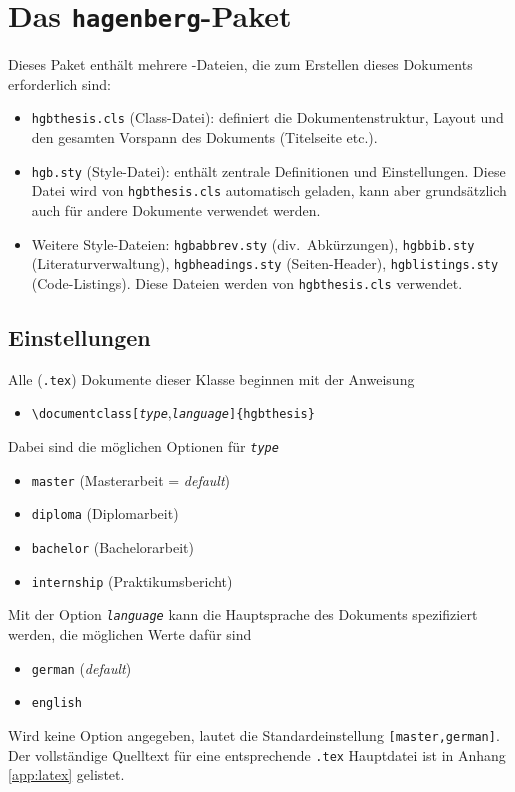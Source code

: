 \section{Das \texttt{hagenberg}-Paket}

Dieses Paket enthält mehrere \latex-Dateien, die 
zum Erstellen dieses Dokuments erforderlich sind:
%
\begin{itemize}
\item \nolinkurl{hgbthesis.cls} (Class-Datei): definiert die 
		Dokumentenstruktur, Layout und den gesamten Vorspann des Dokuments (Titelseite etc.).
\item \nolinkurl{hgb.sty} (Style-Datei): enthält zentrale Definitionen und Einstellungen. 
		Diese Datei wird von \nolinkurl{hgbthesis.cls} automatisch geladen, kann 
		aber grundsätzlich auch für andere Dokumente verwendet werden.
\item Weitere Style-Dateien:
	\nolinkurl{hgbabbrev.sty} (div.\ Abkürzungen),
	\nolinkurl{hgbbib.sty} (Literaturverwaltung),
	\nolinkurl{hgbheadings.sty} (Seiten-Header),
	\nolinkurl{hgblistings.sty} (Code-Listings).
	Diese Dateien werden von \nolinkurl{hgbthesis.cls} verwendet.
\end{itemize}


\subsection{Einstellungen}
\label{sec:HagenbergEinstellungen}


Alle (\verb!.tex!) Dokumente dieser Klasse beginnen mit der Anweisung
%
\begin{itemize}
\item[] \verb!\documentclass[!\texttt{\emph{type}},\texttt{\emph{language}}\verb!]{hgbthesis}! 
\end{itemize}
%
Dabei sind die möglichen Optionen für \texttt{\emph{type}} 
%
\begin{itemize}
\item[] \verb!master! (Masterarbeit = \emph{default})
\item[] \verb!diploma! (Diplomarbeit)
\item[] \verb!bachelor! (Bachelorarbeit)
\item[] \verb!internship! (Praktikumsbericht)
\end{itemize}
%
Mit der Option \texttt{\emph{language}} kann die Hauptsprache des Dokuments spezifiziert werden, 
die möglichen Werte dafür sind
%
\begin{itemize}
\item[] \verb!german! (\emph{default})
\item[] \verb!english!
\end{itemize}
%
Wird keine Option angegeben, lautet die Standardeinstellung \texttt{[master,german]}.
Der vollständige Quelltext für eine entsprechende \verb!.tex! Hauptdatei ist in Anhang \ref{app:latex} 
gelistet.


